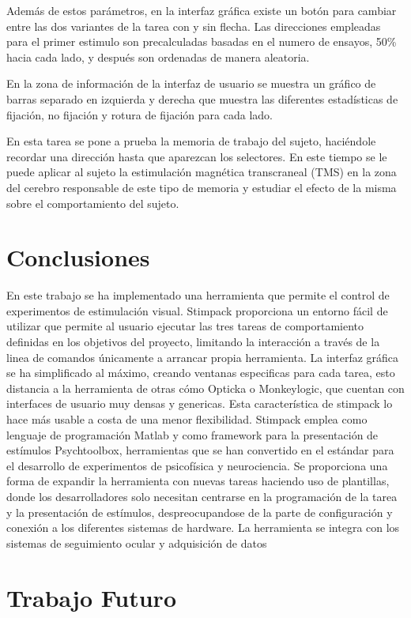 \documentclass[conference]{IEEEtran}
\begin{document}
Además de estos parámetros, en la interfaz gráfica existe un botón para cambiar entre las dos variantes de la tarea con y sin flecha.
Las direcciones empleadas para el primer estimulo son precalculadas basadas en el numero de ensayos, 50\% hacia cada lado, y después son ordenadas de manera aleatoria.

En la zona de información de la interfaz de usuario se muestra un gráfico de barras separado en izquierda y derecha que muestra las diferentes estadísticas de fijación, no fijación y rotura de fijación para cada lado.


En esta tarea se pone a prueba la memoria de trabajo del sujeto, haciéndole recordar una dirección hasta que aparezcan los selectores. En este tiempo se le puede aplicar al sujeto la estimulación magnética transcraneal (TMS) en la zona del cerebro responsable de este tipo de memoria y estudiar el efecto de la misma sobre el comportamiento del sujeto.

\section{Conclusiones}

En este trabajo se ha implementado una herramienta que permite el control de experimentos de estimulación visual.
Stimpack proporciona un entorno fácil de utilizar que permite al usuario ejecutar las tres tareas de comportamiento definidas en los objetivos del proyecto, limitando la interacción a través de la linea de comandos únicamente a arrancar propia herramienta. La interfaz gráfica se ha simplificado al máximo, creando ventanas especificas para cada tarea, esto distancia a la herramienta de otras cómo Opticka o Monkeylogic, que cuentan con interfaces de usuario muy densas y genericas. Esta característica de stimpack lo hace más usable a costa de una menor flexibilidad.
Stimpack emplea como lenguaje de programación Matlab y como framework para la presentación de estímulos Psychtoolbox, herramientas que se han convertido en el estándar para el desarrollo de experimentos de psicofísica y neurociencia.
Se proporciona una forma de expandir la herramienta con nuevas tareas haciendo uso de plantillas, donde los desarrolladores solo necesitan centrarse en la programación de la tarea y la presentación de estímulos, despreocupandose de la parte de configuración y conexión a los diferentes sistemas de hardware.
La herramienta se integra con los sistemas de seguimiento ocular y adquisición de datos


\section{Trabajo Futuro}
\end{document}
